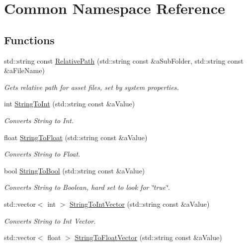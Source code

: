 \hypertarget{namespaceCommon}{}\section{Common Namespace Reference}
\label{namespaceCommon}
\subsection*{Functions}
\begin{DoxyCompactItemize}
\item 
std\+::string const \hyperlink{namespaceCommon_a5e31a3c13642f991a5b3e7b17c97e0c8}{Relative\+Path} (std\+::string const \&a\+Sub\+Folder, std\+::string const \&a\+File\+Name)
\begin{DoxyCompactList}\small\item\em Gets relative path for asset files, set by system properties. \end{DoxyCompactList}\item 
int \hyperlink{namespaceCommon_a489a6fbbf79abd5e4e7a691630d55d8c}{String\+To\+Int} (std\+::string const \&a\+Value)
\begin{DoxyCompactList}\small\item\em Converts String to Int. \end{DoxyCompactList}\item 
float \hyperlink{namespaceCommon_aeac816fd13590f4ad6640aff60414ec7}{String\+To\+Float} (std\+::string const \&a\+Value)
\begin{DoxyCompactList}\small\item\em Converts String to Float. \end{DoxyCompactList}\item 
bool \hyperlink{namespaceCommon_a112a898515a1a04458234ef28ba8525b}{String\+To\+Bool} (std\+::string const \&a\+Value)
\begin{DoxyCompactList}\small\item\em Converts String to Boolean, hard set to look for \char`\"{}true\char`\"{}. \end{DoxyCompactList}\item 
std\+::vector$<$ int $>$ \hyperlink{namespaceCommon_a2911fcaab26e270ccb09d14d88356972}{String\+To\+Int\+Vector} (std\+::string const \&a\+Value)
\begin{DoxyCompactList}\small\item\em Converts String to Int Vector. \end{DoxyCompactList}\item 
std\+::vector$<$ float $>$ \hyperlink{namespaceCommon_a084ca9932c59120f59c770fffa18ac60}{String\+To\+Float\+Vector} (std\+::string const \&a\+Value)

\end{DoxyCompactItemize}
